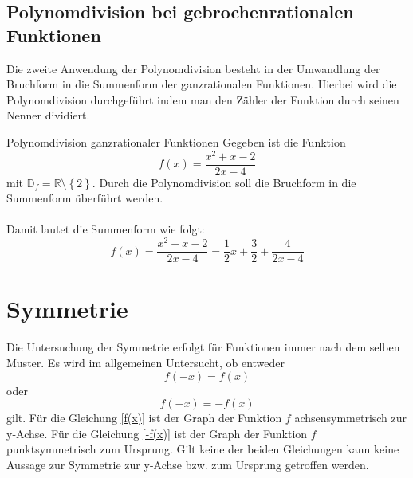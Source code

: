 \subsection{Polynomdivision bei gebrochenrationalen Funktionen}\label{polynomdivisionBruch}
Die zweite Anwendung der Polynomdivision besteht in der Umwandlung der Bruchform in die Summenform der ganzrationalen Funktionen. Hierbei wird die Polynomdivision durchgeführt indem man den Zähler der Funktion durch seinen Nenner dividiert.
\begin{bsp}{Polynomdivision ganzrationaler Funktionen}{}
Gegeben ist die Funktion $$f(x)=\dfrac{x^2+x-2}{2x-4}$$ mit $\mathds{D}_f=\mathds{R}\setminus \left\{ 2 \right\}$. Durch die Polynomdivision soll die Bruchform in die Summenform überführt werden.\\
\\
Damit lautet die Summenform wie folgt:
$$f(x)=\dfrac{x^2+x-2}{2x-4} = \dfrac{1}{2} x +\dfrac{3}{2} +\dfrac{4}{2x-4} $$
\end{bsp}
\section{Symmetrie} 
Die Untersuchung der Symmetrie erfolgt für Funktionen immer nach dem selben Muster. Es wird im allgemeinen Untersucht, ob entweder \begin{equation}\label{f(x)}
    f(-x) = f(x)
\end{equation} oder 
\begin{equation} \label{-f(x)}
f(-x) = -f(x) 
\end{equation} gilt. Für die Gleichung \ref{f(x)} ist der Graph der Funktion $f$ achsensymmetrisch zur y-Achse. Für die Gleichung \ref{-f(x)} ist der Graph der Funktion $f$ punktsymmetrisch zum Ursprung. Gilt keine der beiden Gleichungen kann keine Aussage zur Symmetrie zur y-Achse bzw. zum Ursprung getroffen werden. 
\begin{center}
\end{center}
